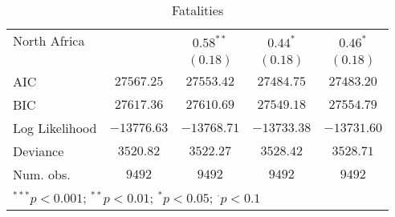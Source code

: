 \begin{sidewaystable}
\begin{center}
{\begin{tabular}{l c c c c}
North Africa                             &               & $0.58^{**}$   & $0.44^{*}$    & $0.46^{*}$      \\
                                         &               & $(0.18)$      & $(0.18)$      & $(0.18)$        \\
\midrule
AIC                                      & $27567.25$    & $27553.42$    & $27484.75$    & $27483.20$      \\
BIC                                      & $27617.36$    & $27610.69$    & $27549.18$    & $27554.79$      \\
Log Likelihood                           & $-13776.63$   & $-13768.71$   & $-13733.38$   & $-13731.60$     \\
Deviance                                 & $3520.82$     & $3522.27$     & $3528.42$     & $3528.71$       \\
Num. obs.                                & $9492$        & $9492$        & $9492$        & $9492$          \\
\bottomrule
\multicolumn{5}{l}{\scriptsize{$^{***}p<0.001$; $^{**}p<0.01$; $^{*}p<0.05$; $^{\cdot}p<0.1$}}
\end{tabular}
}
\caption{Fatalities}
\label{statebaseddeaths}
\end{center}
\end{sidewaystable}
